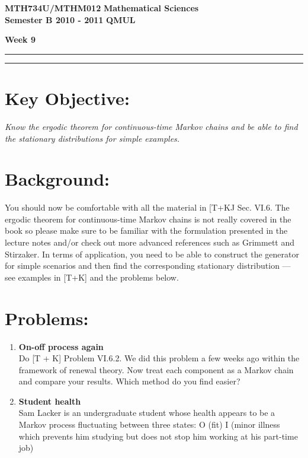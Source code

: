 \documentclass[11pt,a4paper]{article}
\begin{document}
  \textbf{MTH734U/MTHM012} \hfill \textbf{Mathematical Sciences}\\
  \textbf{Semester B 2010 - 2011} \hfill \textbf{QMUL}
  \begin{center}
    \textbf{\huge Week 9}
  \end{center}
  \hrule \vspace{2mm} \hrule
  \section*{Key Objective:}
  \textit{Know the ergodic theorem for continuous-time Markov chains and be able to find the stationary distributions for simple examples.}

  \section*{Background:}
  You should now be comfortable with all the material in [T+KJ Sec. VI.6. The ergodic theorem for continuous-time Markov chains is not really covered in the book so please make sure to be familiar with the formulation presented in the lecture notes and/or check out more advanced references such as Grimmett and Stirzaker. In terms of application, you need to be able to construct the generator for simple scenarios and then find the corresponding stationary distribution — see examples in [T+K] and the problems below.

  \section*{Problems:}
  \begin{enumerate}
    \item \textbf{On-off process again}\\
    Do [T + K] Problem VI.6.2. We did this problem a few weeks ago within the framework of renewal theory. Now treat each component as a Markov chain and compare your results. Which method do you find easier?
    \item \textbf{Student health}\\
    Sam Lacker is an undergraduate student whose health appears to be a Markov process fluctuating between three states: O (fit) I (minor illness which prevents him studying but does not stop him working at his part-time job)
  \end{enumerate}
\end{document}
